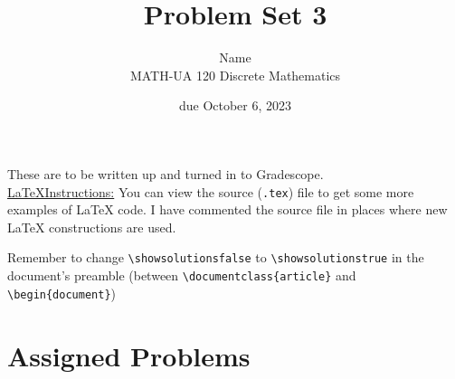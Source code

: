 \documentclass{article}
\title{Problem Set 3}
\author{%
    Name
\\  MATH-UA 120 Discrete Mathematics
}
\date{due October 6, 2023}
\newif\ifshowsolutions
\newcommand{\danger}{\marginpar[\hfill\dbend]{\dbend\hfill}}
\theoremstyle{definition}
\begin{document}
\maketitle



These are to be written up and turned in to Gradescope.\\



\ifshowsolutions
    \SetupExSheets{solution/print=true}
\else
    \danger
 \underline{ \LaTeX  Instructions:}  You can view the source (\texttt{.tex}) file to get some more examples of \LaTeX{} code.  I have commented the source file in places where new \LaTeX{} constructions are used.
  
  Remember to change \verb|\showsolutionsfalse| to \verb|\showsolutionstrue|
    in the document's preamble 
    (between \verb|\documentclass{article}| and \verb|\begin{document}|)
\fi

\section*{Assigned Problems}
\end{document}
